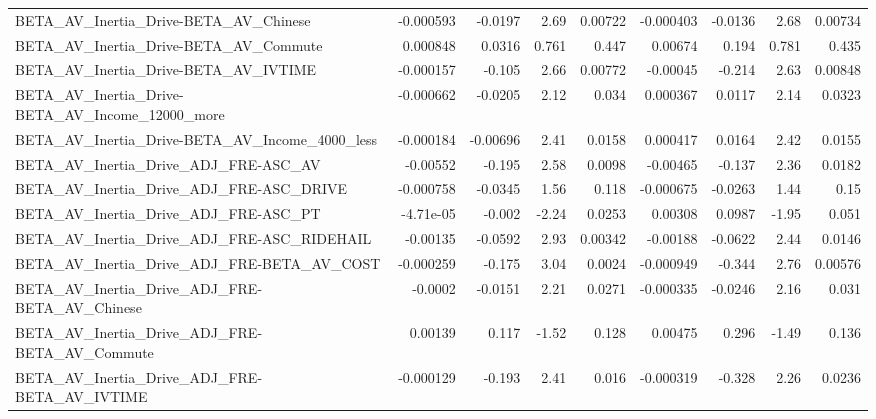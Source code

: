 \begin{tabular}{lrrrrrrrr}
BETA\_AV\_Inertia\_Drive-BETA\_AV\_Chinese              &   -0.000593 &      -0.0197 &     2.69 &  0.00722 &  -0.000403 &     -0.0136 &         2.68 &       0.00734 \\
BETA\_AV\_Inertia\_Drive-BETA\_AV\_Commute              &    0.000848 &       0.0316 &    0.761 &    0.447 &    0.00674 &       0.194 &        0.781 &         0.435 \\
BETA\_AV\_Inertia\_Drive-BETA\_AV\_IVTIME               &   -0.000157 &       -0.105 &     2.66 &  0.00772 &   -0.00045 &      -0.214 &         2.63 &       0.00848 \\
BETA\_AV\_Inertia\_Drive-BETA\_AV\_Income\_12000\_more    &   -0.000662 &      -0.0205 &     2.12 &    0.034 &   0.000367 &      0.0117 &         2.14 &        0.0323 \\
BETA\_AV\_Inertia\_Drive-BETA\_AV\_Income\_4000\_less     &   -0.000184 &     -0.00696 &     2.41 &   0.0158 &   0.000417 &      0.0164 &         2.42 &        0.0155 \\
BETA\_AV\_Inertia\_Drive\_ADJ\_FRE-ASC\_AV               &    -0.00552 &       -0.195 &     2.58 &   0.0098 &   -0.00465 &      -0.137 &         2.36 &        0.0182 \\
BETA\_AV\_Inertia\_Drive\_ADJ\_FRE-ASC\_DRIVE            &   -0.000758 &      -0.0345 &     1.56 &    0.118 &  -0.000675 &     -0.0263 &         1.44 &          0.15 \\
BETA\_AV\_Inertia\_Drive\_ADJ\_FRE-ASC\_PT               &   -4.71e-05 &       -0.002 &    -2.24 &   0.0253 &    0.00308 &      0.0987 &        -1.95 &         0.051 \\
BETA\_AV\_Inertia\_Drive\_ADJ\_FRE-ASC\_RIDEHAIL         &    -0.00135 &      -0.0592 &     2.93 &  0.00342 &   -0.00188 &     -0.0622 &         2.44 &        0.0146 \\
BETA\_AV\_Inertia\_Drive\_ADJ\_FRE-BETA\_AV\_COST         &   -0.000259 &       -0.175 &     3.04 &   0.0024 &  -0.000949 &      -0.344 &         2.76 &       0.00576 \\
BETA\_AV\_Inertia\_Drive\_ADJ\_FRE-BETA\_AV\_Chinese      &     -0.0002 &      -0.0151 &     2.21 &   0.0271 &  -0.000335 &     -0.0246 &         2.16 &         0.031 \\
BETA\_AV\_Inertia\_Drive\_ADJ\_FRE-BETA\_AV\_Commute      &     0.00139 &        0.117 &    -1.52 &    0.128 &    0.00475 &       0.296 &        -1.49 &         0.136 \\
BETA\_AV\_Inertia\_Drive\_ADJ\_FRE-BETA\_AV\_IVTIME       &   -0.000129 &       -0.193 &     2.41 &    0.016 &  -0.000319 &      -0.328 &         2.26 &        0.0236 \\

\end{tabular}
